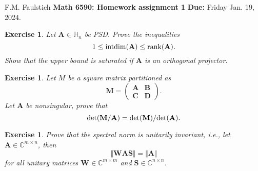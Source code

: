 \documentclass[11pt]{article}
\newcommand{\bvec}[1]{\mathbf{#1}}
\newcommand{\vA}{\bvec{A}}
\newcommand{\vB}{\bvec{B}}
\newcommand{\vC}{\bvec{C}}
\newcommand{\vD}{\bvec{D}}
\newcommand{\vM}{\bvec{M}}
\newcommand{\vS}{\bvec{S}}
\newcommand{\vW}{\bvec{W}}
\newtheorem{exercise}[theorem]{Exercise}
\begin{document}
\begin{flushleft}
F.M. Faulstich \hfill {\large\bf Math 6590: Homework assignment 1} \hfill {\bf Due:} Friday Jan. 19, 2024.\\
\end{flushleft}

\begin{exercise}
Let $\vA\in\mathbb{H}_n$ be PSD. Prove the inequalities
\begin{equation}
1 \leq {\rm intdim}(\vA) \leq {\rm rank} (\vA).
\end{equation}
Show that the upper bound is saturated if $\vA$ is an orthogonal projector.
\end{exercise}

\begin{exercise}
Let $M$ be a square matrix partitioned as 
\begin{equation}
\vM = 
\begin{pmatrix}
\vA & \vB \\
\vC & \vD
\end{pmatrix}.
\end{equation}
Let $\vA$ be nonsingular, prove that
\begin{equation}
{\rm det}(\vM/\vA) = {\rm det}(\vM)/ {\rm det} (\vA).
\end{equation}
\end{exercise}

\begin{exercise}
Prove that the spectral norm is unitarily invariant, i.e., let $\vA\in\mathbb{C}^{m \times n}$, then
$$
\Vert \vW \vA \vS\Vert
=
\Vert  \vA \Vert
$$
for all unitary matrices $\vW \in\mathbb{C}^{m \times m}$ and $\vS\in\mathbb{C}^{n\times n}$.
\end{exercise}
\end{document}
